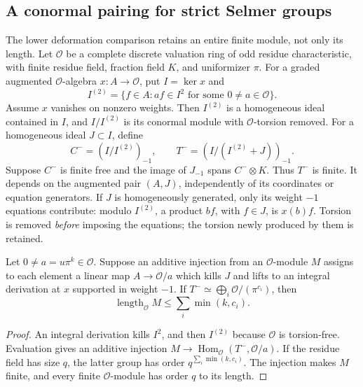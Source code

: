 \subsection{A conormal pairing for strict Selmer groups}
\label{shared-selmer-conormal}

The lower deformation comparison retains an entire finite module,
not only its length. Let $\mathcal O$ be a complete discrete valuation
ring of odd residue characteristic, with finite residue field, fraction
field $K$, and uniformizer $\pi$. For a graded augmented
$\mathcal O$-algebra $x:A\to\mathcal O$, put $I=\ker x$ and
\[
 I^{(2)}=\{f\in A:af\in I^2\text{ for some }0\ne a\in\mathcal O\}.
\]
Assume $x$ vanishes on nonzero weights. Then $I^{(2)}$ is a
homogeneous ideal contained in $I$, and $I/I^{(2)}$ is its conormal
module with $\mathcal O$-torsion removed. For a homogeneous ideal
$J\subset I$, define
\begin{equation}\label{selmer-conormal-quotient}
 C^-=(I/I^{(2)})_{-1},\qquad
 T^-=(I/(I^{(2)}+J))_{-1}.
\end{equation}
Suppose $C^-$ is finite free and the image of $J_{-1}$ spans
$C^-\otimes K$. Thus $T^-$ is finite. It depends on the augmented
pair $(A,J)$, independently of its coordinates or equation generators.
If $J$ is homogeneously generated, only its weight $-1$ equations
contribute: modulo $I^{(2)}$, a product $bf$, with $f\in J$, is
$x(b)f$. Torsion is removed \emph{before} imposing the equations;
the torsion newly produced by them is retained.

\begin{lemma}\label{selmer-conormal-finite-level}
Let $0\ne a=u\pi^k\in\mathcal O$. Suppose an additive injection
from an $\mathcal O$-module $M$ assigns to each element a linear map
$A\to\mathcal O/a$ which kills $J$ and lifts to an integral
derivation at $x$ supported in weight $-1$. If
$T^-\simeq\bigoplus_i\mathcal O/(\pi^{c_i})$, then
\[
 \operatorname{length}_{\mathcal O}M\le\sum_i\min(k,c_i).
\]
\end{lemma}
\begin{proof}
An integral derivation kills $I^2$, and then $I^{(2)}$ because
$\mathcal O$ is torsion-free. Evaluation gives an additive injection
$M\to\operatorname{Hom}_{\mathcal O}(T^-,\mathcal O/a)$.
If the residue field has size $q$, the latter group has order
$q^{\sum_i\min(k,c_i)}$. The injection makes $M$ finite, and every
finite $\mathcal O$-module has order $q$ to its length.
\end{proof}

